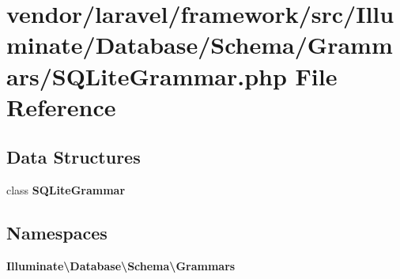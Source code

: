 \section{vendor/laravel/framework/src/\+Illuminate/\+Database/\+Schema/\+Grammars/\+S\+Q\+Lite\+Grammar.php File Reference}
\label{_schema_2_grammars_2_s_q_lite_grammar_8php}
\subsection*{Data Structures}
\begin{DoxyCompactItemize}
\item 
class {\bf S\+Q\+Lite\+Grammar}
\end{DoxyCompactItemize}
\subsection*{Namespaces}
\begin{DoxyCompactItemize}
\item 
 {\bf Illuminate\textbackslash{}\+Database\textbackslash{}\+Schema\textbackslash{}\+Grammars}
\end{DoxyCompactItemize}
